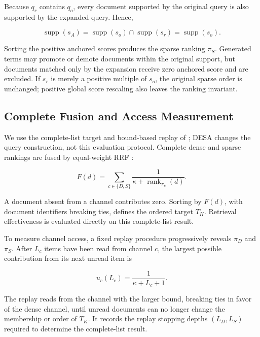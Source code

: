 Because $q_r$ contains $q_o$, every document supported by the original query
is also supported by the expanded query. Hence,

\[
\operatorname{supp}(s_A)
=\operatorname{supp}(s_o)\cap\operatorname{supp}(s_r)
=\operatorname{supp}(s_o).
\]

Sorting the positive anchored scores produces the sparse ranking $\pi_S$.
Generated terms may promote or demote documents within the original support,
but documents matched only by the expansion receive zero anchored score and
are excluded. If $s_r$ is merely a positive multiple of $s_o$, the original
sparse order is unchanged; positive global score rescaling also leaves the
ranking invariant.

\subsection{Complete Fusion and Access Measurement}
\label{sec:quality-access}

We use the complete-list target and bound-based replay of
\citet{zhang2026exact}; DESA changes the query construction, not this evaluation
protocol. Complete dense and sparse rankings are fused by equal-weight RRF
\citep{cormack-etal-2009-rrf}:

\[
F(d)=
\sum_{c\in\{D,S\}}
\frac{1}{\kappa+\operatorname{rank}_{\pi_c}(d)}.
\]

A document absent from a channel contributes zero. Sorting by $F(d)$, with
document identifiers breaking ties, defines the ordered target $T_K$.
Retrieval effectiveness is evaluated directly on this complete-list result.

To measure channel access, a fixed replay procedure progressively reveals
$\pi_D$ and $\pi_S$. After $L_c$ items have been read from channel $c$, the
largest possible contribution from its next unread item is

\[
u_c(L_c)=\frac{1}{\kappa+L_c+1}.
\]

The replay reads from the channel with the larger bound, breaking ties in
favor of the dense channel, until unread documents can no longer change the
membership or order of $T_K$. It records the replay stopping depths
$(L_D,L_S)$ required to determine the complete-list result.
